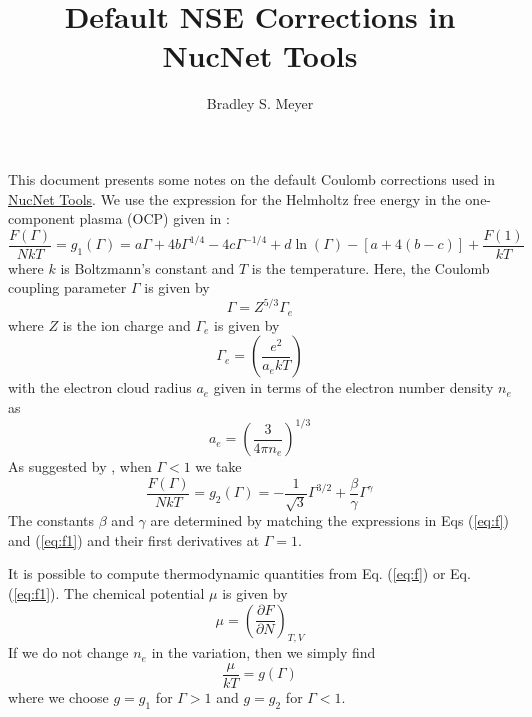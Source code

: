 \documentclass{article}
\begin{document}
\title{Default NSE Corrections in NucNet Tools}
\author{Bradley S. Meyer}

\maketitle

This document presents some notes on the default Coulomb corrections used
in \href{http://nucnet-tools.sourceforge.net}{NucNet Tools}.
We use the expression for the Helmholtz free energy in
the one-component plasma (OCP) given in \cite{1980PhRvA..21.2087S}:
\begin{equation}
\frac{F(\Gamma)}{NkT} = g_1(\Gamma) =
a \Gamma + 4 b \Gamma^{1/4} - 4 c \Gamma^{-1/4} + d\ln(\Gamma) -
\left[ a + 4 (b - c) \right] + \frac{F(1)}{kT}
\label{eq:f}
\end{equation}
where $k$ is Boltzmann's constant and $T$ is the temperature.
Here, the Coulomb coupling parameter $\Gamma$ is given by
\begin{equation}
\Gamma = Z^{5/3} \Gamma_e
\end{equation}
where $Z$ is the ion charge and $\Gamma_e$ is given by
\begin{equation}
\Gamma_e = \left(\frac{e^2}{a_e k T}\right)
\end{equation}
with the electron cloud radius $a_e$ given in terms of the electron number
density $n_e$ as
\begin{equation}
a_e = \left( \frac{3}{4 \pi n_e} \right)^{1/3}
\end{equation}
As suggested by \cite{1999MNRAS.307..984B}, when $\Gamma < 1$ we take
\begin{equation}
\frac{F(\Gamma)}{NkT} = g_2(\Gamma) = -\frac{1}{\sqrt{3}} \Gamma^{3/2} +
\frac{\beta}{\gamma} \Gamma^\gamma
\label{eq:f1}
\end{equation}
The constants $\beta$ and $\gamma$ are determined by
matching the expressions in Eqs (\ref{eq:f}) and (\ref{eq:f1}) and
their first derivatives at $\Gamma = 1$.

It is possible to compute thermodynamic quantities from Eq. (\ref{eq:f})
or Eq. (\ref{eq:f1}).  The chemical potential $\mu$ is given by
\begin{equation}
\mu = \left(\frac{\partial F}{\partial N}\right)_{T,V}
\end{equation}
If we do not change $n_e$ in the variation, then we simply find
\begin{equation}
\frac{\mu}{kT} = g(\Gamma)
\end{equation}
where we choose $g = g_1$ for $\Gamma > 1$ and $g = g_2$ for $\Gamma < 1$.
\end{document}
